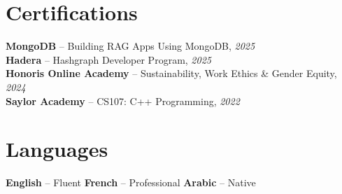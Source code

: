 \documentclass[10pt,a4paper]{article}
\begin{document}
\section*{Certifications}
{\small
\textbf{MongoDB} -- Building RAG Apps Using MongoDB, \textit{2025}\\[1pt]
\textbf{Hadera} -- Hashgraph Developer Program, \textit{2025}\\[1pt]
\textbf{Honoris Online Academy} -- Sustainability, Work Ethics \& Gender Equity, \textit{2024}\\[1pt]
\textbf{Saylor Academy} -- CS107: C++ Programming, \textit{2022}
}

\section*{Languages}
{\small
\textbf{English} -- Fluent \quad\textbar\quad \textbf{French} -- Professional \quad\textbar\quad \textbf{Arabic} -- Native
}
\end{document}

